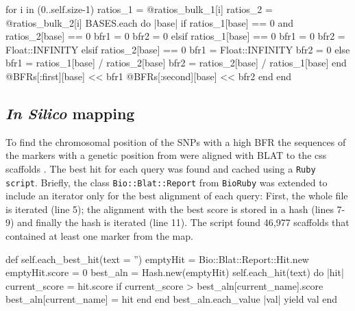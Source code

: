\begin{code}[language=Ruby,caption=Section of the code that , label=lst:yr15:bfr]
for i in (0..self.size-1)
  ratios_1 = @ratios_bulk_1[i]
  ratios_2 = @ratios_bulk_2[i]
  BASES.each do |base| 
    if ratios_1[base] == 0 and ratios_2[base] == 0
      bfr1 = 0
      bfr2 = 0
    elsif ratios_1[base] == 0
      bfr1 = 0
      bfr2 = Float::INFINITY
    elsif ratios_2[base] == 0
      bfr1 = Float::INFINITY
      bfr2 = 0
    else
      bfr1 = ratios_1[base] / ratios_2[base]
      bfr2 = ratios_2[base] / ratios_1[base]
    end
    @BFRs[:first][base] << bfr1
    @BFRs[:second][base] << bfr2
  end
end
\end{code}

\subsection{\textit{In Silico} mapping}
\label{yr15:met:inSilico}

To find the chromosomal position of the SNPs with a high BFR the sequences of the markers with a genetic position from \citet{Wang2014} were aligned with BLAT \citep{Kent2002} to the \acrshort{css} scaffolds \citep{Mayer2014}. 
The best hit for each query was found and cached using a \texttt{Ruby script}. 
Briefly, the class \texttt{Bio::Blat::Report} from \texttt{BioRuby} \citep{Goto2010} was extended to include an iterator only for the best alignment of each query: 
First, the whole file is iterated (line 5); the alignment with the best score is stored in a hash (lines 7-9) and finally the hash is iterated (line 11).
The script found 46,977 scaffolds that contained at least one marker from the map. 

\begin{code}[language=Ruby, caption={[\texttt{Bio::Blat::Report.each\_best\_hit}] Extension to \texttt{Bio::Blat::Report} that selects the best alignment from a \texttt{psl file from BLAT}}, label=lst:yr15:bestHit]
def self.each_best_hit(text = '')
  emptyHit = Bio::Blat::Report::Hit.new
  emptyHit.score = 0
  best_aln = Hash.new(emptyHit)
  self.each_hit(text) do |hit|
    current_score = hit.score
    if current_score > best_aln[current_name].score
      best_aln[current_name] = hit 
    end
  end
  best_aln.each_value { |val| yield  val }
end
\end{code}

